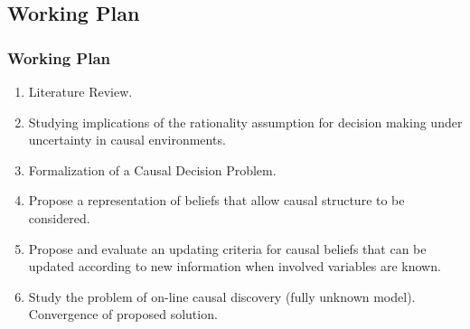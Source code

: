 \documentclass{beamer}
\theoremstyle{plain}
\begin{document}
\subsection{Working Plan}
\begin{frame}
\frametitle{Working Plan}
\begin{enumerate}
\item Literature Review.
\item Studying implications of the rationality assumption for decision making under uncertainty in causal environments.
\item Formalization of a Causal Decision Problem.
\item Propose a representation of beliefs that allow causal structure to be considered.
\item Propose and evaluate an updating criteria for causal beliefs that can be updated according to new information when involved variables are known.
\item Study the problem of on-line causal discovery (fully unknown model). Convergence of proposed solution.
\end{enumerate}
\end{frame}
\end{document}
